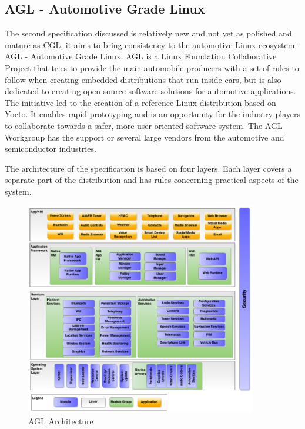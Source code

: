 \subsection{AGL - Automotive Grade Linux}
The second specification discussed is relatively new and not yet as polished and mature as CGL, it aims to bring consistency to the automotive Linux ecosystem - AGL - Automotive Grade Linux. AGL is a Linux Foundation Collaborative Project that tries to provide the main automobile producers with a set of rules to follow when creating embedded distributions that run inside cars, but is also dedicated to creating open source software solutions for automotive applications. The initiative led to the creation of a reference Linux distribution based on Yocto. It enables rapid prototyping and is an opportunity for the industry players to collaborate towards a safer, more user-oriented software system. The AGL Workgroup has the support or several large vendors from the automotive and semiconductor industries.

The architecture of the specification is based on four layers. Each layer covers a separate part of the distribution and has rules concerning practical aspects of the system.

\begin{figure}[h!]
  \centering
	\includegraphics[width=0.9\textwidth]{images/agl_arch.jpg}
    \caption{AGL Architecture}
\end{figure}

